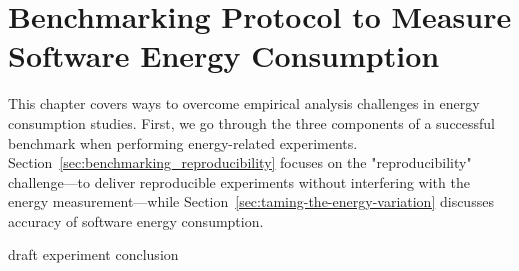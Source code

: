 
\chapter{Benchmarking Protocol to Measure Software Energy Consumption}\label{chapter:benchmarking}
This chapter covers ways to overcome empirical analysis challenges in energy consumption studies.
First, we go through the three components of a successful benchmark when performing energy-related experiments.
Section~\ref{sec:benchmarking_reproducibility} focuses on the "reproducibility" challenge---to deliver reproducible experiments without interfering with the energy measurement---while Section~\ref{sec:taming-the-energy-variation} discusses accuracy of software energy consumption.

{draft}
{experiment}
{conclusion}

